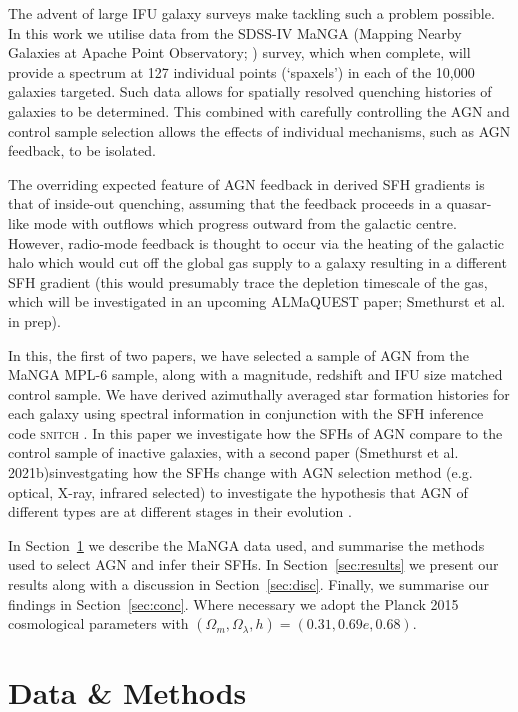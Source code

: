 \documentclass[useAMS,usenatbib]{mn2e}
\begin{document}
 The advent of large IFU galaxy surveys make tackling such a problem possible. In this work we utilise data from the SDSS-IV MaNGA (Mapping Nearby Galaxies at Apache Point Observatory; \citealt{bundy15}) survey, which when complete, will provide a spectrum at 127 individual points (`spaxels') in each of the 10,000 galaxies targeted. Such data allows for spatially resolved quenching histories of galaxies to be determined. This combined with carefully controlling the AGN and control sample selection allows the effects of individual mechanisms, such as AGN feedback, to be isolated.

The overriding expected feature of AGN feedback in derived SFH gradients is that of inside-out quenching, assuming that the feedback proceeds in a quasar-like mode with outflows which progress outward from the galactic centre. However, radio-mode feedback is thought to occur via the heating of the galactic halo which would cut off the global gas supply to a galaxy resulting in a different SFH gradient (this would presumably trace the depletion timescale of the gas, which will be investigated in an upcoming ALMaQUEST paper; Smethurst et al. in prep). 

In this, the first of two papers, we have selected a sample of AGN from the MaNGA MPL-6 sample, along with a magnitude, redshift and IFU size matched control sample. We have derived azimuthally averaged star formation histories for each galaxy using spectral information in conjunction with the SFH inference code \textsc{snitch} \cite{smethurst19a}. In this paper we investigate how the SFHs of AGN compare to the control sample of inactive galaxies, with a second paper (Smethurst et al. 2021b)sinvestgating how the SFHs change with AGN selection method (e.g. optical, X-ray, infrared selected) to investigate the hypothesis that AGN of different types are at different stages in their evolution \cite{hopkinspaper}. 

In Section~\ref{sec:data} we describe the MaNGA data used, and summarise the methods used to select AGN and infer their SFHs. In Section~\ref{sec:results} we present our results along with a discussion in Section~\ref{sec:disc}. Finally, we summarise our findings in Section~\ref{sec:conc}. Where necessary we adopt the Planck 2015 \citep{planck16} cosmological parameters with $(\Omega_m, \Omega_{\lambda}, h) = (0.31, 0.69e, 0.68)$. 

\section{Data \& Methods}\label{sec:data}
\end{document}
